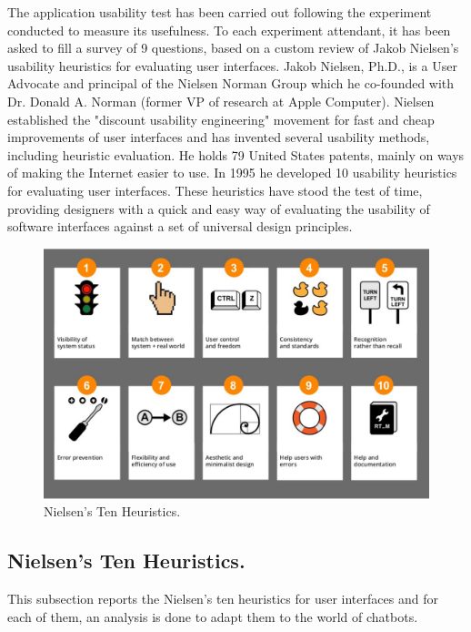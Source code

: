 \documentclass[b5paper,10pt,twoside,cucitura]{toptesi}
\begin{document}
The application usability test has been carried out following the experiment conducted to measure its usefulness. To each experiment attendant, it has been asked to fill a survey of 9 questions, based on a custom review of Jakob Nielsen's usability heuristics for evaluating user interfaces. Jakob Nielsen, Ph.D., is a User Advocate and principal of the Nielsen Norman Group which he co-founded with Dr. Donald A. Norman (former VP of research at Apple Computer). Nielsen established the "discount usability engineering" movement for fast and cheap improvements of user interfaces and has invented several usability methods, including heuristic evaluation. He holds 79 United States patents, mainly on ways of making the Internet easier to use. In 1995 he developed 10 usability heuristics    \citep{Nielsen} for evaluating user interfaces. These heuristics have stood the test of time, providing designers with a quick and easy way of evaluating the usability of software interfaces against a set of universal design principles.

\begin{figure}[ht]
\centering
\includegraphics[scale=0.4]{nielsen_heuristics.png}
\caption{Nielsen's Ten Heuristics.}
\end{figure}

\subsection{Nielsen's Ten Heuristics.}
This subsection reports the Nielsen's ten heuristics for user interfaces and for each of them, an analysis is done to adapt them to the world of chatbots.
\end{document}

